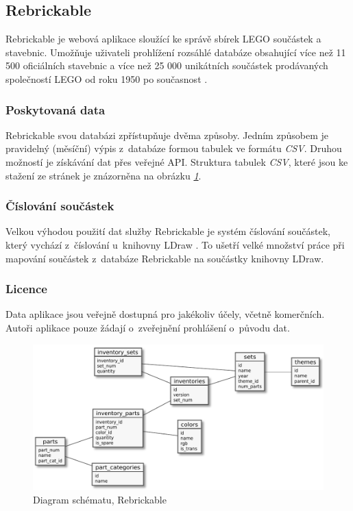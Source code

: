 \subsection{Rebrickable}\label{reserse-rebrickable}
  Rebrickable \autocite{rebrickable:homepage} je webová aplikace sloužící ke správě sbírek LEGO součástek a stavebnic. Umožňuje uživateli prohlížení rozsáhlé databáze obsahující více než 11 500 oficiálních stavebnic a více než 25 000 unikátních součástek prodávaných společností LEGO od roku 1950 po současnost \autocite{rebrickable:about}. 

  \subsubsection*{Poskytovaná data}  
  Rebrickable svou databázi zpřístupňuje dvěma způsoby. Jedním způsobem je pravidelný (měsíční) výpis z~databáze formou tabulek ve formátu \textit{\gls{CSV}}. Druhou možností je získávání dat přes veřejné \gls{API}. Struktura tabulek \textit{\gls{CSV}}, které jsou ke stažení ze stránek \autocite{rebrickable:download} je znázorněna na obrázku \emph{\ref{diagram-rebrickable}}.

  \subsubsection*{Číslování součástek}
  Velkou výhodou použití dat služby Rebrickable je systém číslování součástek, který vychází z~číslování u~knihovny LDraw \autocite{rebrickable:faq}. To ušetří velké množství práce při mapování součástek z~databáze Rebrickable na součástky knihovny LDraw. 
  
  \subsubsection*{Licence}
  Data aplikace jsou veřejně dostupná pro jakékoliv účely, včetně komerčních. Autoři aplikace pouze žádají o~zveřejnění prohlášení o~původu dat. \autocite{rebrickable:terms}
  
  \begin{figure}[htbp]
    \centering
    \includegraphics[width=\textwidth,height=\textheight,keepaspectratio]{pdfs/rebrickable_schema}
    \caption{Diagram schématu, Rebrickable \autocite{rebrickable:download}\label{diagram-rebrickable}}
  \end{figure}

